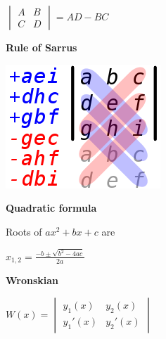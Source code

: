 \begin{minipage}{0.23\linewidth}
\(
\begin{vmatrix}
  A & B \\ C & D
\end{vmatrix} = AD - BC \)
\end{minipage}\hfill\begin{minipage}{0.23\linewidth}
  \centering
  \textbf{Rule of Sarrus}

  \vspace{1em}

  \includegraphics[width=.8\linewidth]{figs/rule-of-sarrus.png}
\end{minipage}\hfill\begin{minipage}{0.23\linewidth}
    \centering
    \textbf{Quadratic formula}

    \vspace{1em}
    Roots of \(ax^{2} + bx + c\) are

    \(x_{1,2} = \frac{-b \pm \sqrt{b^{2} - 4ac}}{2a}\)
  \end{minipage}\hfill\begin{minipage}{0.23\linewidth}
    \centering
 \textbf{Wronskian}

\vspace{1em}

\(W(x) = \begin{vmatrix}
    y_{1}(x) & y_{2}(x) \\
    y_{1}'(x) & y_{2}'(x)
  \end{vmatrix}\)

\end{minipage}

\vfill

